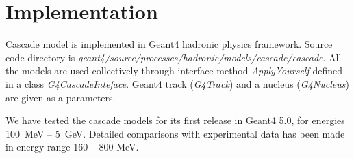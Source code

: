 \section{Implementation}


Cascade model is implemented in {\sc Geant4} hadronic physics framework. Source code directory is {\it geant4/\-source/\-processes/\-hadronic/\-models/\-cascade/\-cascade}.
All the models are used collectively through interface method {\it Apply\-Yourself} defined in a class {\it G4Cascade\-Inteface}.
{\sc Geant4} track  ({\it G4Track}) and a nucleus ({\it G4Nucleus}) are given as a parameters.

We have tested the cascade models for its first release in {\sc Geant4 5.0}, for energies 100~MeV -- 5~GeV. 
Detailed comparisons with experimental data has been made in energy range 160 -- 800 MeV. 


